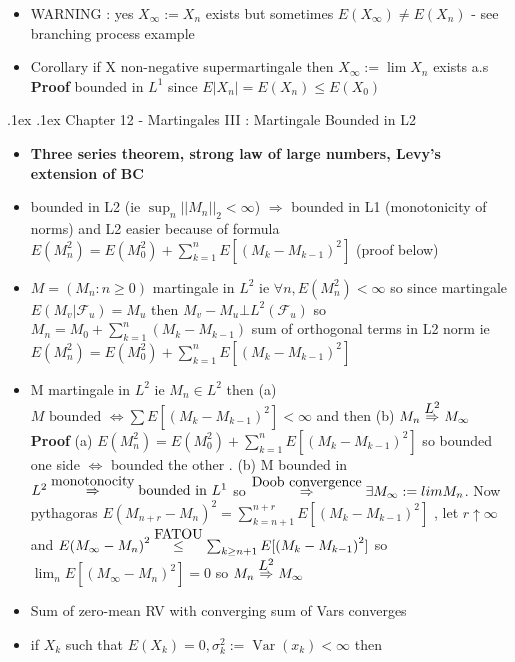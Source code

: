 \documentclass[10pt,landscape,a4paper]{article}
\makeatletter
\renewcommand{\section}{\@startsection{section}{1}{0mm}%
                                {.1ex}%
                                {.1ex}%
                                {\color{blue}\sffamily\small\bfseries}}
\newcommand{\myFF}{\mathcal{F}}
\newcommand\myle[1]{\stackrel{{\normalfont\mbox{#1}}}{ \le }}
\newcommand\myright[1]{\stackrel{{\normalfont\mbox{#1}}}{ \Rightarrow }}
\newcommand{\Var}{ \operatorname{Var} }
\makeatother
\begin{document}
\begin{multicols*}{3}
\begin{spacing}{0.5}
\begin{itemize}
\item \colorbox{green!30}{WARNING} : yes $X_{\infty} := X_n$ exists but sometimes $E(X_{\infty}) \neq E(X_{n})$ - see branching process example

\item \colorbox{green!10}{Corollary} if X non-negative supermartingale  then $X_{\infty}:= \lim X_n$ exists a.s \textbf{Proof} bounded in $L^1$ since $E|X_n|=E(X_n) \le E(X_0)$

\end{itemize}
\section{Chapter 12 - Martingales III : Martingale Bounded in L2 }
\begin{itemize}
\item \textbf{Three series theorem, strong law of large numbers, Levy's extension of BC}

\item bounded in L2 (ie $\sup_n {||M_n||}_2 < \infty$) $\Rightarrow$ bounded in L1 (monotonicity of norms) and L2 easier because of formula $E(M_n^2) = E(M_0^2) + \sum_{k=1}^n E[{(M_k-M_{k-1})}^2]$ (proof below)

\item $M = (M_n : n \ge 0)$ martingale in $L^2$ ie $\forall n, E(M_n^2) < \infty$ so since martingale  $E(M_v|\myFF_{u})=M_u$ then $M_v - M_u \bot L^2(\myFF_{u})$ so $M_n = M_0 + \sum_{k=1}^n (M_k - M_{k-1})$ sum of orthogonal terms in L2 norm ie $E(M_n^2) = E(M_0^2) + \sum_{k=1}^n E[{(M_k-M_{k-1})}^2]$

\item M martingale in $L^2$ ie $M_n \in L^2$ then (a) $M \text{ bounded } \Leftrightarrow \sum E[{(M_k - M_{k-1})}^2] < \infty$ and then (b) $M_n \myright{$L^2$} M_{\infty}$ \textbf{Proof} (a) $E(M_n^2) = E(M_0^2) + \sum_{k=1}^n E[{(M_k-M_{k-1})}^2]$ so bounded one side $\Leftrightarrow$ bounded the other . (b) M bounded in  $L^2 \myright{monotonocity} \text{bounded in } L^1$ so $\myright{Doob convergence} \exists M_{\infty} := lim M_n$. Now pythagoras $E{(M_{n+r}-M_n)}^2 = \sum_{k=n+1}^{n+r} E[{(M_k-M_{k-1})}^2]$ , let $r \uparrow \infty$ and $E{(M_{\infty}-M_n)}^2 \myle{FATOU} \sum_{k \ge n+1} E[ {(M_k-M_{k-1})}^2]$ so $\lim_n E[{(M_{\infty}-M_n)}^2] =0$ so $M_n \myright{$L^2$} M_{\infty}$

\item \colorbox{green!10}{Sum of zero-mean RV with converging sum of Vars converges}
\item if $X_k$ such that $E(X_k)=0,\sigma_k^2 := \Var (x_k) < \infty$ then


\end{itemize}
\end{spacing}
\end{multicols*}
\end{document}
